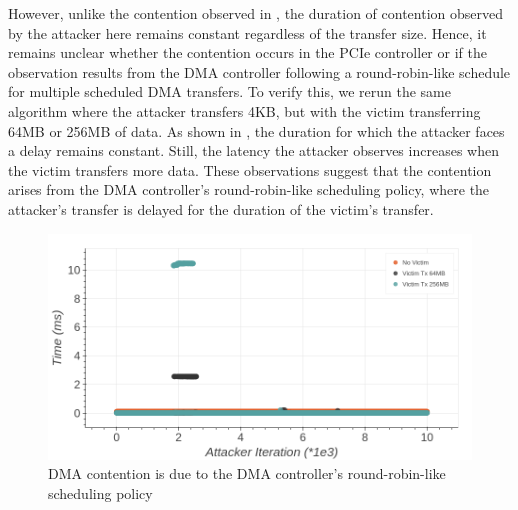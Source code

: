 \vspace{1em}
However, unlike the contention observed in , the duration of contention observed by the attacker here remains constant regardless of the transfer size.
Hence, it remains unclear whether the contention occurs in the PCIe controller or if the observation results from the DMA controller following a round-robin-like schedule for multiple scheduled DMA transfers.
To verify this, we rerun the same algorithm where the attacker transfers 4KB, but with the victim transferring 64MB or 256MB of data.
As shown in , the duration for which the attacker faces a delay remains constant.
Still, the latency the attacker observes increases when the victim transfers more data.
These observations suggest that the contention arises from the DMA controller's round-robin-like scheduling policy, where the attacker's transfer is delayed for the duration of the victim's transfer.

\begin{figure}[!htb]
    \centering
    \includegraphics[width=\textwidth]{figures/interconnect-sc/dma/dma_contention_round_robin.png}
    \caption{DMA contention is due to the DMA controller's round-robin-like scheduling policy}
    \label{fig:dma-contention-round-robin}
\end{figure}